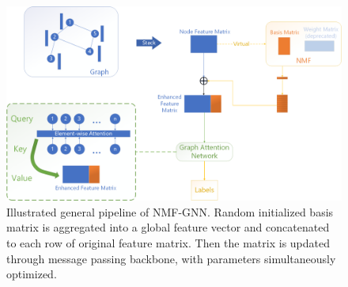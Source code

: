 \documentclass[english,onecolumn]{IEEEtran}
\begin{document}
	
	
\begin{figure}
	\label{pipeline}
	\centering
	\includegraphics[width=\linewidth]{graph1}
	\caption{Illustrated general pipeline of NMF-GNN. Random initialized basis matrix is aggregated into a global feature vector and concatenated to each row of original feature matrix. Then the matrix is updated through message passing backbone, with parameters simultaneously optimized. }
	\label{fig:graph1}
\end{figure}
		
\end{document}
